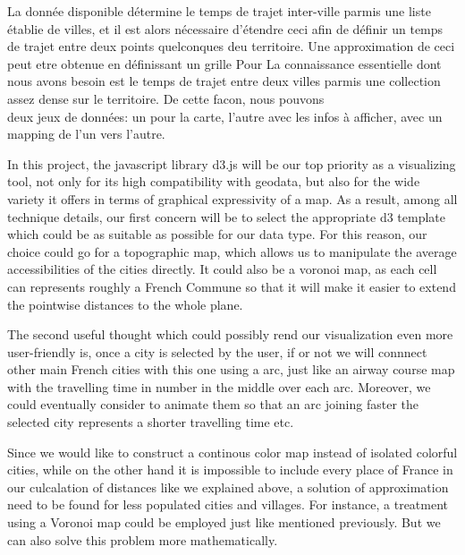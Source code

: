 \documentclass{vgtc}                          %
\begin{document}
\vspace{0.2cm}


La donnée disponible détermine le temps de trajet inter-ville parmis une liste établie de villes, et il est alors nécessaire d'étendre ceci afin de définir un temps de trajet entre deux points quelconques deu territoire. Une approximation de ceci peut etre obtenue en définissant un grille  Pour 
La connaissance essentielle dont nous avons besoin est le temps de trajet entre deux villes parmis une collection assez dense sur le territoire. De cette facon, nous pouvons\\

deux jeux de données: un pour la carte, l'autre avec les infos à afficher, avec un mapping de l'un vers l'autre.


In this project, the javascript library d3.js will be our top priority as a visualizing tool, 
not only for its high compatibility with geodata, but also for the wide variety it offers in terms of graphical expressivity of a map. 
As a result, among all technique details, our first concern will be to select the appropriate d3 template which could be as suitable as possible for our data type.
For this reason, our choice could go for a topographic map, which allows us to manipulate the average accessibilities of the cities directly. It could
also be a voronoi map, as each cell can represents roughly a French Commune so that it will make it easier to extend the pointwise distances to the whole plane.

The second useful thought which could possibly rend our visualization even more user-friendly is, once a city is selected by the user, if or not we will connnect 
other main French cities with this one using a arc, just like an airway course map with the travelling time in number in the middle over each arc. Moreover, we could  
eventually consider to animate them so that an arc joining faster the selected city represents a shorter travelling time etc.

Since we would like to construct a continous color map instead of isolated colorful cities, while on the other hand it is impossible to include every place of France
in our culcalation of distances like we explained above, a solution of approximation need to be found for less populated cities and villages. For instance, a 
treatment using a Voronoi map could be employed just like mentioned previously. But we can also solve this problem more mathematically.
\end{document}
